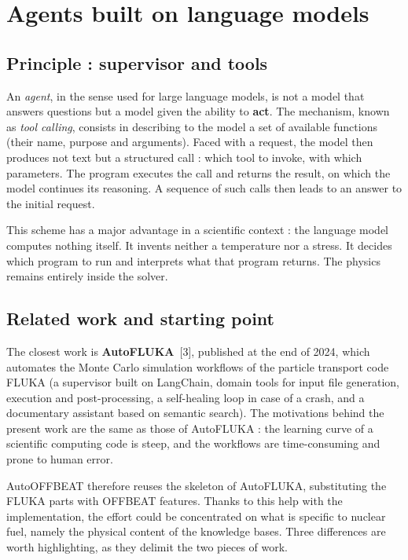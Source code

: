 \section{Agents built on language models}

\subsection{Principle : supervisor and tools}

An \textit{agent}, in the sense used for large language models, is not a model
that answers questions but a model given the ability to \textbf{act}. The
mechanism, known as \textit{tool calling}, consists in describing to the model a
set of available functions (their name, purpose and arguments). Faced with a
request, the model then produces not text but a structured call : which tool to
invoke, with which parameters. The program executes the call and returns the
result, on which the model continues its reasoning. A sequence of such calls
then leads to an answer to the initial request.

This scheme has a major advantage in a scientific context : the language model
computes nothing itself. It invents neither a temperature nor a stress. It
decides which program to run and interprets what that program returns. The
physics remains entirely inside the solver.

\subsection{Related work and starting point}

The closest work is \textbf{AutoFLUKA}~[3], published at the end of \num{2024},
which automates the Monte Carlo simulation workflows of the particle transport
code FLUKA (a supervisor built on LangChain, domain tools for input file
generation, execution and post-processing, a self-healing loop in case of a
crash, and a documentary assistant based on semantic search). The motivations
behind the present work are the same as those of AutoFLUKA : the learning curve
of a scientific computing code is steep, and the workflows are time-consuming
and prone to human error.

AutoOFFBEAT therefore reuses the skeleton of AutoFLUKA, substituting the FLUKA
parts with OFFBEAT features. Thanks to this help with the implementation, the
effort could be concentrated on what is specific to nuclear fuel, namely the
physical content of the knowledge bases. Three differences are worth
highlighting, as they delimit the two pieces of work.

